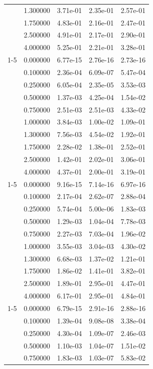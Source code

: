 \begin{tabular}{llrrr}
 & 1.300000 & 3.71e-01 & 2.35e-01 & 2.57e-01 \\
 & 1.750000 & 4.83e-01 & 2.16e-01 & 2.47e-01 \\
 & 2.500000 & 4.91e-01 & 2.17e-01 & 2.90e-01 \\
 & 4.000000 & 5.25e-01 & 2.21e-01 & 3.28e-01 \\
\cline{1-5}
\multirow[t]{10}{*}{grid} & 0.000000 & 6.77e-15 & 2.76e-16 & 2.73e-16 \\
 & 0.100000 & 2.36e-04 & 6.09e-07 & 5.47e-04 \\
 & 0.250000 & 6.05e-04 & 2.35e-05 & 3.53e-03 \\
 & 0.500000 & 1.37e-03 & 4.25e-04 & 1.54e-02 \\
 & 0.750000 & 2.51e-03 & 2.51e-03 & 4.33e-02 \\
 & 1.000000 & 3.84e-03 & 1.00e-02 & 1.09e-01 \\
 & 1.300000 & 7.56e-03 & 4.54e-02 & 1.92e-01 \\
 & 1.750000 & 2.28e-02 & 1.38e-01 & 2.52e-01 \\
 & 2.500000 & 1.42e-01 & 2.02e-01 & 3.06e-01 \\
 & 4.000000 & 4.37e-01 & 2.00e-01 & 3.19e-01 \\
\cline{1-5}
\multirow[t]{10}{*}{grid7} & 0.000000 & 9.16e-15 & 7.14e-16 & 6.97e-16 \\
 & 0.100000 & 2.17e-04 & 2.62e-07 & 2.88e-04 \\
 & 0.250000 & 5.74e-04 & 5.00e-06 & 1.83e-03 \\
 & 0.500000 & 1.29e-03 & 1.04e-04 & 7.78e-03 \\
 & 0.750000 & 2.27e-03 & 7.03e-04 & 1.96e-02 \\
 & 1.000000 & 3.55e-03 & 3.04e-03 & 4.30e-02 \\
 & 1.300000 & 6.68e-03 & 1.37e-02 & 1.21e-01 \\
 & 1.750000 & 1.86e-02 & 1.41e-01 & 3.82e-01 \\
 & 2.500000 & 1.89e-01 & 2.95e-01 & 4.47e-01 \\
 & 4.000000 & 6.17e-01 & 2.95e-01 & 4.84e-01 \\
\cline{1-5}
\multirow[t]{10}{*}{star} & 0.000000 & 6.79e-15 & 2.91e-16 & 2.88e-16 \\
 & 0.100000 & 1.39e-04 & 9.08e-08 & 3.38e-04 \\
 & 0.250000 & 4.30e-04 & 1.09e-07 & 2.46e-03 \\
 & 0.500000 & 1.10e-03 & 1.04e-07 & 1.51e-02 \\
 & 0.750000 & 1.83e-03 & 1.03e-07 & 5.83e-02 \\

\end{tabular}
